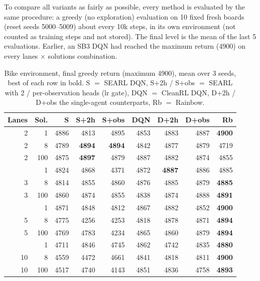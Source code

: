 \documentclass[11pt]{article}
\begin{document}
To compare all variants as fairly as possible, every method is evaluated by the same procedure: a greedy
(no exploration) evaluation on 10 fixed fresh boards (reset seeds 5000--5009) about every 10k steps, in its own
environment (not counted as training steps and not stored). The final level is the mean of the last 5 evaluations.
Earlier, an SB3 DQN had reached the maximum return (4900) on every lanes $\times$ solutions combination.

\begin{table}[h]
\centering\small
\begin{tabular}{rrrrrrrrr}
\toprule
Lanes & Sol. & S & S+2h & S+obs & DQN & D+2h & D+obs & Rb \\
\midrule
2 & 1 & 4886 & 4813 & 4895 & 4853 & 4883 & 4887 & \textbf{4900} \\
2 & 8 & 4789 & \textbf{4894} & \textbf{4894} & 4842 & 4877 & 4879 & 4719 \\
2 & 100 & 4875 & \textbf{4897} & 4879 & 4887 & 4882 & 4874 & 4855 \\
\addlinespace
3 & 1 & 4824 & 4868 & 4371 & 4872 & \textbf{4887} & 4886 & 4885 \\
3 & 8 & 4814 & 4855 & 4860 & 4876 & 4885 & 4879 & \textbf{4885} \\
3 & 100 & 4860 & 4874 & 4855 & 4838 & 4874 & 4888 & \textbf{4891} \\
\addlinespace
5 & 1 & 4871 & 4848 & 4812 & 4867 & 4882 & 4852 & \textbf{4900} \\
5 & 8 & 4775 & 4256 & 4253 & 4818 & 4878 & 4871 & \textbf{4894} \\
5 & 100 & 4769 & 4783 & 4234 & 4865 & 4860 & 4879 & \textbf{4894} \\
\addlinespace
10 & 1 & 4711 & 4846 & 4745 & 4862 & 4742 & 4835 & \textbf{4880} \\
10 & 8 & 4559 & 4472 & 4661 & 4841 & 4818 & 4811 & \textbf{4900} \\
10 & 100 & 4517 & 4740 & 4143 & 4851 & 4836 & 4758 & \textbf{4893} \\
\bottomrule
\end{tabular}
\caption{Bike environment, final greedy return (maximum 4900), mean over 3 seeds, best of each row in bold.
S $=$ SEARL DQN, S+2h / S+obs $=$ SEARL with 2 / per-observation heads (lr gate), DQN $=$ CleanRL DQN,
D+2h / D+obs the single-agent counterparts, Rb $=$ Rainbow.}
\label{tab:bike}
\end{table}
\end{document}
